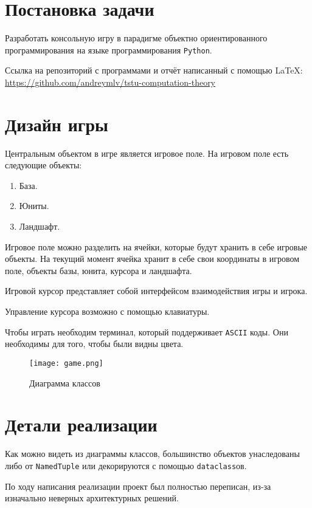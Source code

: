 \section*{Постановка задачи}
Разработать консольную игру в парадигме объектно ориентированного
программирования на языке программирования \verb|Python|.

Ссылка на репозиторий с программами и отчёт написанный с помощью \LaTeX\@:
\url{https://github.com/andreymlv/tstu-computation-theory}

\section{Дизайн игры}

Центральным объектом в игре является игровое поле.
На игровом поле есть следующие объекты:
\begin{enumerate}
	\item База.
	\item Юниты.
	\item Ландшафт.
\end{enumerate}

Игровое поле можно разделить на ячейки, которые будут хранить в себе игровые объекты.
На текущий момент ячейка хранит в себе свои координаты в игровом поле, объекты базы,
юнита, курсора и ландшафта.

Игровой курсор представляет собой интерфейсом взаимодействия игры и игрока.

Управление курсора возможно с помощью клавиатуры.

Чтобы играть необходим терминал, который поддерживает \verb|ASCII| коды.
Они необходимы для того, чтобы были видны цвета.

\begin{figure}[H]
	\begin{center}
		\texttt{[image: game.png]}
		\caption{Диаграмма классов}
	\end{center}
\end{figure}

\section{Детали реализации}

Как можно видеть из диаграммы классов, большинство объектов унаследованы либо от
\verb|NamedTuple| или декорируются с помощью \verb|dataclass|ов.

По ходу написания реализации проект был полностью переписан, из-за изначально неверных
архитектурных решений.

